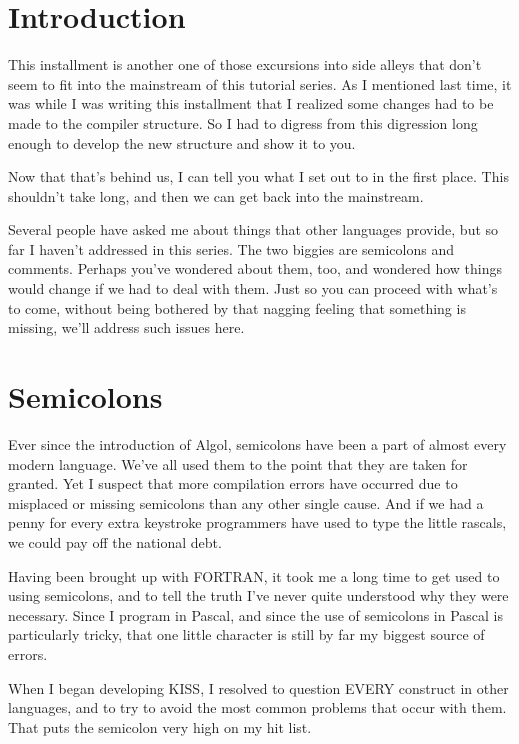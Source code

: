 \documentclass[float=false, crop=false]{standalone}
\begin{document}
\section{Introduction}

This installment is another one of those excursions into side alleys that don't
seem to fit into the mainstream of this tutorial series. As I mentioned last
time, it was while I was writing this installment that I realized some changes
had to be made to the compiler structure. So I had to digress from this
digression long enough to develop the new structure and show it to you.

Now that that's behind us, I can tell you what I set out to in the first place.
This shouldn't take long, and then we can get back into the mainstream.

Several people have asked me about things that other languages provide, but so
far I haven't addressed in this series. The two biggies are semicolons and
comments. Perhaps you've wondered about them, too, and wondered how things would
change if we had to deal with them. Just so you can proceed with what's to come,
without being bothered by that nagging feeling that something is missing, we'll
address such issues here.


\section{Semicolons}

Ever since the introduction of Algol, semicolons have been a part of almost
every modern language. We've all used them to the point that they are taken for
granted. Yet I suspect that more compilation errors have occurred due to
misplaced or missing semicolons than any other single cause. And if we had a
penny for every extra keystroke programmers have used to type the little
rascals, we could pay off the national debt.

Having been brought up with FORTRAN, it took me a long time to get used to using
semicolons, and to tell the truth I've never quite understood why they were
necessary. Since I program in Pascal, and since the use of semicolons in Pascal
is particularly tricky, that one little character is still by far my biggest
source of errors.

When I began developing KISS, I resolved to question EVERY construct in other
languages, and to try to avoid the most common problems that occur with them.
That puts the semicolon very high on my hit list.
\end{document}
